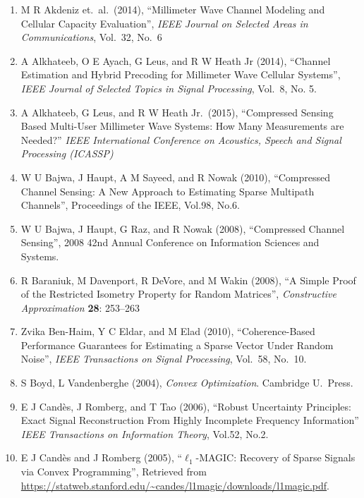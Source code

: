 \documentclass[12pt]{article}
\begin{document}
\begin{enumerate}

\item M R Akdeniz et.\ al.\ (2014), ``Millimeter Wave Channel Modeling and Cellular Capacity Evaluation'', \textit{IEEE Journal on Selected Areas in Communications}, Vol.\ 32, No.\ 6

\item A Alkhateeb, O E Ayach, G Leus, and R W Heath Jr (2014), ``Channel Estimation and Hybrid Precoding for Millimeter Wave Cellular Systems'', \textit{IEEE Journal of Selected Topics in Signal Processing}, Vol.\ 8, No. 5.

\item A Alkhateeb, G Leus, and R W Heath Jr.\ (2015), ``Compressed Sensing Based Multi-User Millimeter Wave Systems: How Many Measurements are Needed?'' \textit{IEEE International Conference on Acoustics, Speech and Signal Processing (ICASSP)}

\item W U Bajwa, J Haupt, A M Sayeed, and R Nowak (2010), ``Compressed Channel Sensing: A New Approach to Estimating Sparse Multipath Channels'', Proceedings of the IEEE, Vol.98, No.6.

\item W U Bajwa, J Haupt, G Raz, and R Nowak (2008), ``Compressed Channel Sensing'', 2008 42nd Annual Conference on Information Sciences and Systems.

\item R Baraniuk, M Davenport, R DeVore, and M Wakin (2008), ``A Simple Proof of the Restricted Isometry Property for Random Matrices'', \textit{Constructive Approximation} \textbf{28}: 253–263

\item Zvika Ben-Haim, Y C Eldar, and M Elad (2010), ``Coherence-Based Performance Guarantees for Estimating a Sparse Vector Under Random Noise'', \textit{IEEE Transactions on Signal Processing}, Vol.\ 58, No.\ 10.

\item S Boyd, L Vandenberghe (2004), \textit{Convex Optimization}. Cambridge U.\ Press.

\item E J Cand\`es, J Romberg, and T Tao (2006), ``Robust Uncertainty Principles: Exact Signal Reconstruction From Highly Incomplete Frequency Information'' \textit{IEEE Transactions on Information Theory}, Vol.52, No.2.

\item E J Cand\`es and J Romberg (2005), ``\(\ell_1\)-MAGIC: Recovery of Sparse Signals via Convex Programming'', Retrieved from \url{https://statweb.stanford.edu/~candes/l1magic/downloads/l1magic.pdf}.


\end{enumerate}
\end{document}
